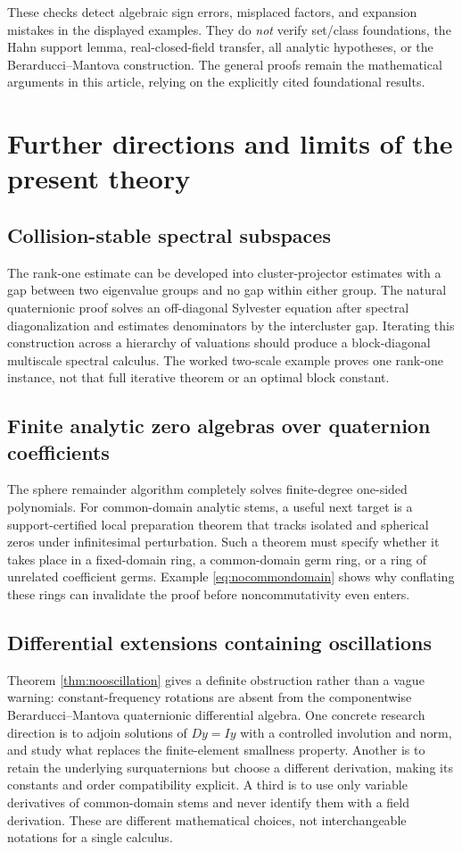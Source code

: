 \documentclass[11pt,letterpaper]{article}
\numberwithin{equation}{section}
\theoremstyle{definition}
\theoremstyle{remark}
\begin{document}
These checks detect algebraic sign errors, misplaced factors, and expansion mistakes in the
displayed examples. They do \emph{not} verify set/class foundations, the Hahn support lemma,
real-closed-field transfer, all analytic hypotheses, or the Berarducci--Mantova construction.
The general proofs remain the mathematical arguments in this article, relying on the
explicitly cited foundational results.

\section{Further directions and limits of the present theory}\label{sec:directions}

\subsection{Collision-stable spectral subspaces}
The rank-one estimate can be developed into cluster-projector estimates with a gap between
two eigenvalue groups and no gap within either group. The natural quaternionic proof solves
an off-diagonal Sylvester equation after spectral diagonalization and estimates denominators
by the intercluster gap. Iterating this construction across a hierarchy of valuations should
produce a block-diagonal multiscale spectral calculus. The worked two-scale example proves
one rank-one instance, not that full iterative theorem or an optimal block constant.

\subsection{Finite analytic zero algebras over quaternion coefficients}
The sphere remainder algorithm completely solves finite-degree one-sided polynomials.
For common-domain analytic stems, a useful next target is a support-certified local
preparation theorem that tracks isolated and spherical zeros under infinitesimal perturbation.
Such a theorem must specify whether it takes place in a fixed-domain ring, a common-domain
germ ring, or a ring of unrelated coefficient germs. Example \eqref{eq:nocommondomain}
shows why conflating these rings can invalidate the proof before noncommutativity even enters.

\subsection{Differential extensions containing oscillations}
Theorem \ref{thm:nooscillation} gives a definite obstruction rather than a vague warning:
constant-frequency rotations are absent from the componentwise Berarducci--Mantova
quaternionic differential algebra. One concrete research direction is to adjoin solutions
of $Dy=Iy$ with a controlled involution and norm, and study what replaces the finite-element
smallness property. Another is to retain the underlying surquaternions but choose a different
derivation, making its constants and order compatibility explicit. A third is to use only
variable derivatives of common-domain stems and never identify them with a field derivation.
These are different mathematical choices, not interchangeable notations for a single calculus.
\end{document}
